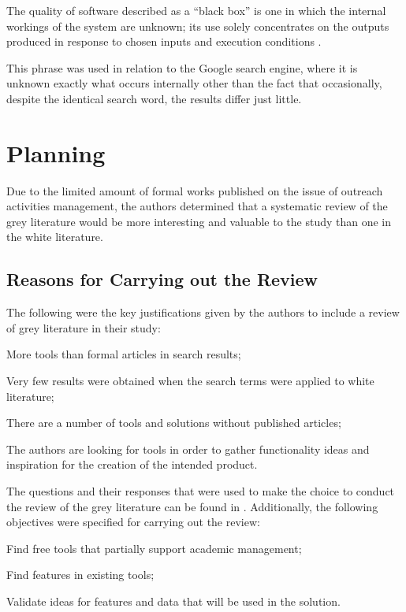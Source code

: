 The quality of software described as a ``black box'' is one in which the internal workings of the system are unknown; its use solely concentrates on the outputs produced in response to chosen inputs and execution conditions \textcite{nidhra2012black}.

This phrase was used in relation to the Google search engine, where it is unknown exactly what occurs internally other than the fact that occasionally, despite the identical search word, the results differ just little.

\section{Planning}\label{sec:gl-planning}

Due to the limited amount of formal works published on the issue of outreach activities management, the authors determined that a systematic review of the grey literature would be more interesting and valuable to the study than one in the white literature.

\subsection{Reasons for Carrying out the Review}\label{sec:gl-planning-motives}

The following were the key justifications given by the authors to include a review of grey literature in their study:
\begin{inparaenum}[(i)]
    \item More tools than formal articles in search results;
    \item Very few results were obtained when the search terms were applied to white literature;
  \item There are a number of tools and solutions without published articles;
  \item The authors are looking for tools in order to gather functionality ideas and inspiration for the creation of the intended product.
\end{inparaenum}

The questions and their responses that were used to make the choice to conduct the review of the grey literature can be found in . Additionally, the following objectives were specified for carrying out the review:

\begin{inparaenum}[(i)]
  \item Find free tools that partially support academic management;
  \item Find features in existing tools;
  \item Validate ideas for features and data that will be used in the solution.
\end{inparaenum}

